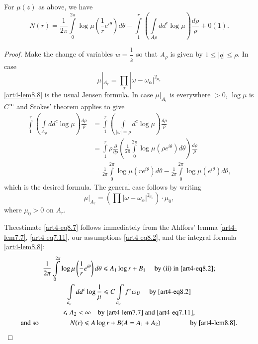 \setcounter{lemma}{7}
\begin{lemma}\label{art4-lem8.8}
For $\mu(z)$ as above, we have 
$$
N (r) = \frac{1}{2\pi} \int\limits^{2\pi}_0 \log \mu \left(\frac{1}{r} e^{i\theta} \right) d \theta - \int\limits^r_1 \left(\int\limits_{A\rho} dd^c \log \mu \right) \frac{d\rho}{\rho} + 0 (1).
$$
\end{lemma}

\begin{proof}
Make the change of variables $w = \dfrac{1}{z}$ so that $A_\rho$ is given by $1 \leqslant |q| \leqslant \rho$. In case
$$
\mu |_{A_r} = \prod\limits_\alpha  |\omega- \omega_\alpha|^{2_{\mu_\alpha}}
$$
\eqref{art4-lem8.8} is the usual Jensen formula. In case $\mu|_{A_r}$ is everywhere $>0$,  $\log \mu$ is $C^\infty$ and Stokes' theorem applies to give
\begin{align*}
\int\limits^r_1 \left(\int\limits_{A_\rho} dd^c \log \mu \right) \frac{d\rho}{\rho} & = \int\limits^r_1 \left(\int\limits_{|\omega|=\rho} d^c \log \mu \right) \frac{d\rho}{\rho}\\
& = \int\limits^r_1 \rho \frac{\partial}{\partial \rho} \left(\frac{1}{2\pi} \int\limits^{2\pi}_0 \log \mu (\rho e^{i\theta}) d\theta \right) \frac{d\rho}{\rho}\\
& = \frac{1}{2\pi} \int\limits^{2\pi}_0 \log \mu (re^{i\theta}) d\theta - \frac{1}{2\pi} \int\limits^{2\pi}_{0} \log \mu (e^{i\theta}) d \theta,
\end{align*}
which is the desired formula. The general case follows by writing
$$
\mu|_{A_r} = (\prod |\omega -\omega_\alpha|^{2_{\mu_\alpha}}) \cdot \mu_0,
$$
where $\mu_0 > 0$ on $A_r$.

The\pageoriginale estimate \eqref{art4-eq8.7} follows immediately from the Ahlfors' lemma \eqref{art4-lem7.7}, \eqref{art4-eq7.11}, our assumptions \eqref{art4-eq8.2}, and the integral formula \eqref{art4-lem8.8}:
\begin{gather*}
\frac{1}{2\pi} \int\limits^{2\pi}_0 \log \mu \left(\frac{1}{r}e^{i\theta} \right) d \theta \leqslant A_1 \log r + B_1 \quad \text{ by (ii) in \eqref{art4-eq8.2};}\\
\int\limits_{a_\rho} dd^c \log \frac{1}{\mu} \leqslant C \int\limits_{a_\rho} f^\ast \omega_U \quad \text{ by \eqref{art4-eq8.2}}\\
\leqslant A_2 < \infty \quad \text{by \eqref{art4-lem7.7} and \eqref{art4-eq7.11},}\\
\text{and so } \hspace{1.5cm} N (r) \leqslant A \log r + B (A = A_1 + A_2) \hspace{1.5cm}  \text{by \eqref{art4-lem8.8}.}
\end{gather*}
\end{proof}

